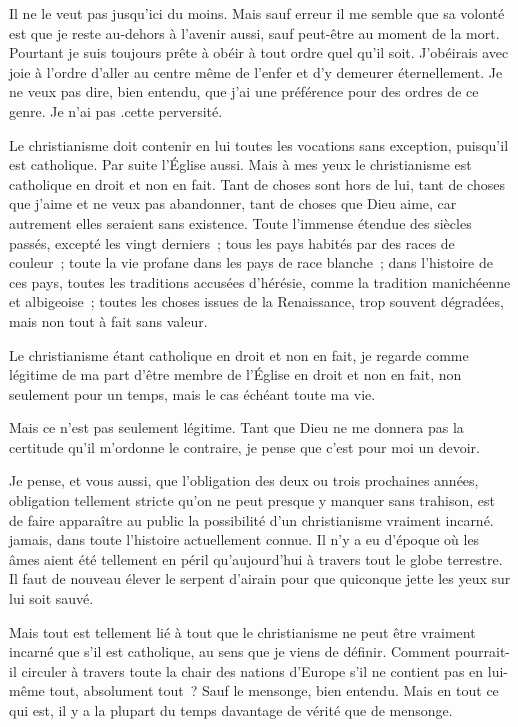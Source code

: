 \documentclass[french,twoside]{book} %
\begin{document}
Il ne le veut pas jusqu'ici du moins. Mais sauf erreur il me semble que sa volonté est que je reste au-dehors à l'avenir aussi, sauf peut-être au moment de la mort. Pourtant je suis toujours prête à obéir à tout ordre quel qu'il soit. J'obéirais avec joie à l'ordre d'aller au centre même de l'enfer et d'y demeurer éternellement. Je ne veux pas dire, bien entendu, que j'ai une préférence pour des ordres de ce genre. Je n'ai pas .cette perversité.\par
Le christianisme doit contenir en lui toutes les vocations sans exception, puisqu'il est catholique. Par suite l'Église aussi. Mais à mes yeux le christianisme est catholique en droit et non en fait. Tant de choses sont hors de lui, tant de choses que j'aime et ne veux pas abandonner, tant de choses que Dieu aime, car autrement elles seraient sans existence. Toute l'immense étendue des siècles passés, excepté les vingt derniers ; tous les pays habités par des races de couleur ; toute la vie profane dans les pays de race blanche ; dans l'histoire de ces pays, toutes les traditions accusées d'hérésie, comme la tradition manichéenne et albigeoise ; toutes les choses issues de la Renaissance, trop souvent dégradées, mais non tout à fait sans valeur.\par
Le christianisme étant catholique en droit et non en fait, je regarde comme légitime de ma part d'être membre de l'Église en droit et non en fait, non seulement pour un temps, mais le cas échéant toute ma vie.\par
Mais ce n'est pas seulement légitime. Tant que Dieu ne me donnera pas la certitude qu'il m'ordonne le contraire, je pense que c'est pour moi un devoir.\par
Je pense, et vous aussi, que l'obligation des deux ou trois prochaines années, obligation tellement stricte qu'on ne peut presque y manquer sans trahison, est de faire apparaître au public la possibilité d'un christianisme vraiment incarné. jamais, dans toute l'histoire actuellement connue. Il n'y a eu d'époque où les âmes aient été tellement en péril qu'aujourd'hui à travers tout le globe terrestre. Il faut de nouveau élever le serpent d'airain pour que quiconque jette les yeux sur lui soit sauvé.\par
Mais tout est tellement lié à tout que le christianisme ne peut être vraiment incarné que s'il est catholique, au sens que je viens de définir. Comment pourrait-il circuler à travers toute la chair des nations d'Europe s'il ne contient pas en lui-même tout, absolument tout ? Sauf le mensonge, bien entendu. Mais en tout ce qui est, il y a la plupart du temps davantage de vérité que de mensonge.\par
\end{document}
